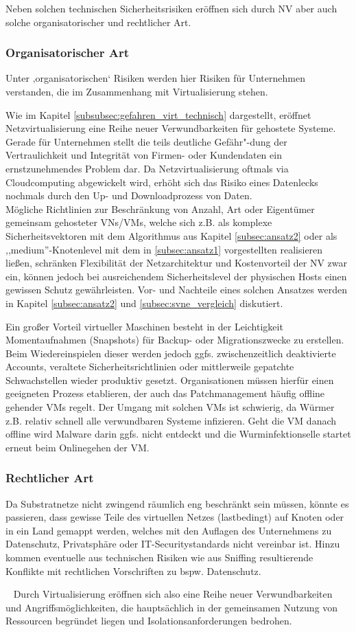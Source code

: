 Neben solchen technischen Sicherheitsrisiken eröffnen sich durch NV aber auch solche organisatorischer und rechtlicher Art.


\subsubsection{Organisatorischer Art}
\label{subsubsec:gefahren_virt_organisatorisch}
Unter ‚organisatorischen‘ Risiken werden hier Risiken für Unternehmen verstanden, die im Zusammenhang mit Virtualisierung stehen.

Wie im Kapitel \ref{subsubsec:gefahren_virt_technisch} dargestellt, eröffnet Netzvirtualisierung eine Reihe neuer Verwundbarkeiten für gehostete Systeme. Gerade für Unternehmen stellt die teils deutliche Gefähr"-dung der Vertraulichkeit und Integrität von Firmen- oder Kundendaten ein ernstzunehmendes Problem dar. Da Netzvirtualisierung oftmals via Cloudcomputing abgewickelt wird, erhöht sich das Risiko eines Datenlecks nochmals durch den Up- und Downloadprozess von Daten.\\
Mögliche Richtlinien zur Beschränkung von Anzahl, Art oder Eigentümer gemeinsam gehosteter VNs/VMs, welche sich z.B. als komplexe Sicherheitsvektoren mit dem Algorithmus aus Kapitel \ref{subsec:ansatz2} oder als ,,medium''-Knotenlevel mit dem in \ref{subsec:ansatz1} vorgestellten realisieren ließen, schränken Flexibilität der Netzarchitektur und Kostenvorteil der NV zwar ein, können jedoch bei ausreichendem Sicherheitslevel der physischen Hosts einen gewissen Schutz gewährleisten. Vor- und Nachteile eines solchen Ansatzes werden in Kapitel \ref{subsec:ansatz2} und \ref{subsec:svne_vergleich} diskutiert.

Ein großer Vorteil virtueller Maschinen besteht in der Leichtigkeit Momentaufnahmen (Snapshots) für Backup- oder Migrationszwecke zu erstellen. Beim Wiedereinspielen dieser werden jedoch ggfs. zwischenzeitlich deaktivierte Accounts, veraltete Sicherheitsrichtlinien oder mittlerweile gepatchte Schwachstellen wieder produktiv gesetzt. Organisationen müssen hierfür einen geeigneten Prozess etablieren, der auch das Patchmanagement häufig offline gehender VMs regelt. Der Umgang mit solchen VMs ist schwierig, da Würmer z.B. relativ schnell alle verwundbaren Systeme infizieren. Geht die VM danach offline wird Malware darin ggfs. nicht entdeckt und die Wurminfektionselle startet erneut beim Onlinegehen der VM. \cite{garfinkel2005virtual} 



\subsubsection{Rechtlicher Art}
\label{subsubsec:gefahren_virt_rechtlich}
Da Substratnetze nicht zwingend räumlich eng beschränkt sein müssen, könnte es passieren, dass gewisse Teile des virtuellen Netzes (lastbedingt) auf Knoten oder in ein Land gemappt werden, welches mit den Auflagen des Unternehmens zu Datenschutz, Privatsphäre oder IT-Securitystandards nicht vereinbar ist. 
Hinzu kommen eventuelle aus technischen Risiken wie aus Sniffing resultierende Konflikte mit rechtlichen Vorschriften zu bspw. Datenschutz.


~\newline
Durch Virtualisierung eröffnen sich also eine Reihe neuer Verwundbarkeiten und Angriffsmöglichkeiten, die hauptsächlich in der gemeinsamen Nutzung von Ressourcen begründet liegen und Isolationsanforderungen bedrohen.